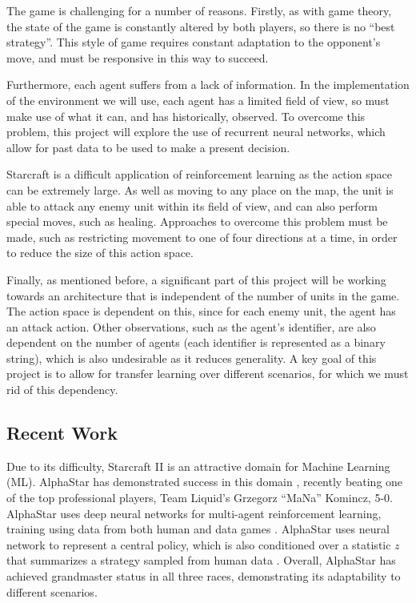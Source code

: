 The game is challenging for a number of reasons. Firstly, as with game theory, the state of the game is constantly altered by both players, so there is no ``best strategy''. This style of game requires constant adaptation to the opponent's move, and must be responsive in this way to succeed. 

Furthermore, each agent suffers from a lack of information. In the implementation of the environment we will use, each agent has a limited field of view, so must make use of what it can, and has historically, observed. To overcome this problem, this project will explore the use of recurrent neural networks, which allow for past data to be used to make a present decision.

Starcraft is a difficult application of reinforcement learning as the action space can be extremely large. As well as moving to any place on the map, the unit is able to attack any enemy unit within its field of view, and can also perform special moves, such as healing. Approaches to overcome this problem must be made, such as restricting movement to one of four directions at a time, in order to reduce the size of this action space. 

Finally, as mentioned before, a significant part of this project will be working towards an architecture that is independent of the number of units in the game. The action space is dependent on this, since for each enemy unit, the agent has an attack action. Other observations, such as the agent's identifier, are also dependent on the number of agents (each identifier is represented as a binary string), which is also undesirable as it reduces generality. A key goal of this project is to allow for transfer learning over different scenarios, for which we must rid of this dependency.

\subsection{Recent Work}

Due to its difficulty, Starcraft II is an attractive domain for Machine Learning (ML). AlphaStar has demonstrated success in this domain \cite{alphastar}, recently beating one of the top professional players, Team Liquid’s Grzegorz ``MaNa'' Komincz, 5-0. AlphaStar uses deep neural networks for multi-agent reinforcement learning, training using data from both human and data games \cite{alphastar}. AlphaStar uses neural network to represent a central policy, which is also conditioned over a statistic $z$ that summarizes a strategy sampled from human data \cite{alphastar}. Overall, AlphaStar has achieved grandmaster status in all three races, demonstrating its adaptability to different scenarios.


